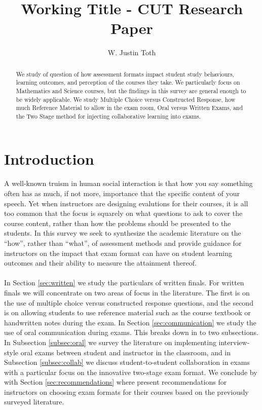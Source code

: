 \documentclass[12pt]{article}
\title{Working Title - CUT Research Paper}
\author{W. Justin Toth}
\begin{document}
\maketitle
\begin{abstract}
We study of question of how assessment formats impact student study behaviours, learning outcomes, and perception of the courses they take. We particularly focus on Mathematics and Science courses, but the findings in this survey are general enough to be widely applicable. We study Multiple Choice versus Constructed Response, how much Reference Material to allow in the exam room, Oral versus Written Exams, and the Two Stage method for injecting collaborative learning into exams.
\end{abstract}
\tableofcontents
\section{Introduction}

\paragraph{}
A well-known truism in human social interaction is that how you say something often has as much, if not more, importance that the specific content of your speech. Yet when instructors are designing evalutions for their courses, it is all too common that the focus is squarely on what questions to ask to cover the course content, rather than how the problems should be presented to the students. In this survey we seek to synthesize the academic literature on the ``how'', rather than ``what'', of assessment methods and provide guidance for instructors on the impact that exam format can have on student learning outcomes and their ability to measure the attainment thereof.
\paragraph{}
In Section \ref{sec:written} we study the particulars of written finals. For written finals we will concentrate on two areas of focus in the literature. The first is on the use of multiple choice versus constructed response questions, and the second is on allowing students to use reference material such as the course textbook or handwritten notes during the exam. In Section \ref{sec:communication} we study the use of oral communication during exams. This breaks down in to two subsections. In Subsection \ref{subsec:oral} we survey the literature on implementing interview-style oral exams  between student and instructor in the classroom, and in Subsection \ref{subsec:collab} we discuss student-to-student collaboration in exams with a particular focus on the innovative two-stage exam format. We conclude by with Section \ref{sec:recommendations} where present recommendations for instructors on choosing exam formats for their courses based on the previously surveyed literature.
\end{document}
